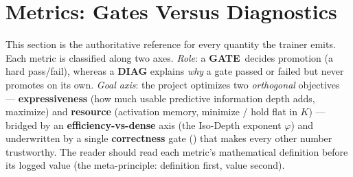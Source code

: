\documentclass[11pt]{article}
\newcommand{\code}[1]{\texttt{#1}}
\newcommand{\GATE}{\textcolor{gate}{\textbf{GATE}}}
\newcommand{\DIAG}{\textcolor{diag}{\textbf{DIAG}}}
\begin{document}
\section{Metrics: Gates Versus Diagnostics}
\label{sec:metrics}

This section is the authoritative reference for every quantity the trainer emits.  Each metric is
classified along two axes.  \emph{Role}: a \GATE\ decides promotion (a hard pass/fail), whereas a
\DIAG{} explains \emph{why} a gate passed or failed but never promotes on its own.  \emph{Goal axis}:
the project optimizes two \emph{orthogonal} objectives --- \textbf{expressiveness} (how much usable
predictive information depth adds, maximize) and \textbf{resource} (activation memory, minimize / hold
flat in \(K\)) --- bridged by an \textbf{efficiency-vs-dense} axis (the Iso-Depth exponent \(\varphi\))
and underwritten by a single \textbf{correctness} gate (\code{}) that makes
every other number trustworthy.  The reader should read each metric's mathematical definition before
its logged value (the meta-principle: definition first, value second).
\end{document}
